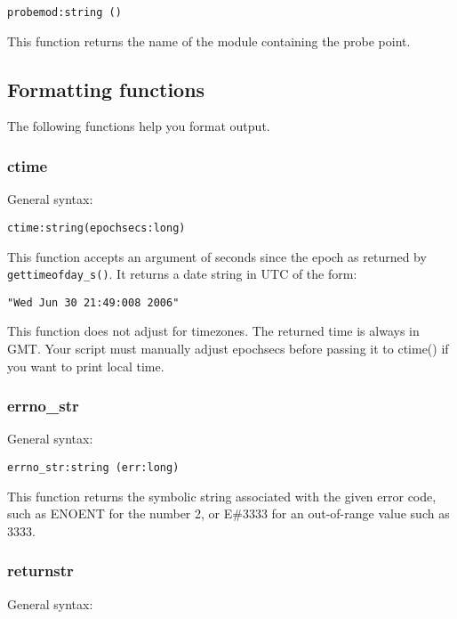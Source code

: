 \documentclass[twoside,english]{article}
\newenvironment{vindent}
{\begin{list}{}{\setlength{\listparindent}{6pt}}
\item[]}
{\end{list}}
\begin{document}
\begin{vindent}
\begin{verbatim}
probemod:string ()
\end{verbatim}
\end{vindent}
This function returns the name of the module containing the probe point.


\subsection{Formatting functions}
The following functions help you format output.


\subsubsection{ctime}
General syntax:

\begin{vindent}
\begin{verbatim}
ctime:string(epochsecs:long)
\end{verbatim}
\end{vindent}
This function accepts an argument of seconds since the epoch as returned
by \texttt{gettimeofday\_s()}. It returns a date string in UTC of the form:

\begin{vindent}
\begin{verbatim}
"Wed Jun 30 21:49:008 2006"
\end{verbatim}
\end{vindent}
This function does not adjust for timezones. The returned time is always
in GMT. Your script must manually adjust epochsecs before passing it to ctime()
if you want to print local time.


\subsubsection{errno\_str}
General syntax:

\begin{vindent}
\begin{verbatim}
errno_str:string (err:long)
\end{verbatim}
\end{vindent}
This function returns the symbolic string associated with the given error
code, such as ENOENT for the number 2, or E\#3333 for an out-of-range value
such as 3333.


\subsubsection{returnstr}
General syntax:
\end{document}
